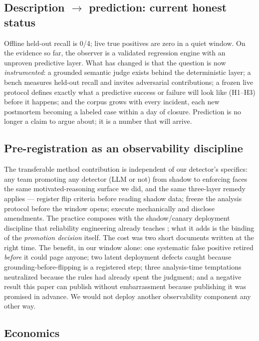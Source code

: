 \documentclass[11pt]{article}
\begin{document}
\subsection{Description $\rightarrow$ prediction: current honest status}

Offline held-out recall is 0/4; live true positives are zero in a quiet
window. On the evidence so far, the observer is a validated regression
engine with an unproven predictive layer. What has changed is that the
question is now \emph{instrumented}: a grounded semantic judge exists
behind the deterministic layer; a bench measures held-out recall and
invites adversarial contributions; a frozen live protocol defines
exactly what a predictive success or failure will look like (H1--H3)
before it happens; and the corpus grows with every incident, each new
postmortem becoming a labeled case within a day of closure. Prediction
is no longer a claim to argue about; it is a number that will arrive.

\subsection{Pre-registration as an observability discipline}
\label{sec:transfer}

The transferable method contribution is independent of our detector's
specifics: any team promoting any detector (LLM or not) from shadow to
enforcing faces the same motivated-reasoning surface we did, and the
same three-layer remedy applies --- register flip criteria before
reading shadow data; freeze the analysis protocol before the window
opens; execute mechanically and disclose amendments. The practice
composes with the shadow/canary deployment discipline that reliability
engineering already teaches \cite{beyer2016sre}; what it adds is the
binding of the \emph{promotion decision} itself. The cost was two short
documents written at the right time. The benefit, in our window alone:
one systematic false positive retired \emph{before} it could page
anyone; two latent deployment defects caught because
grounding-before-flipping is a registered step; three analysis-time
temptations neutralized because the rules had already spent the
judgment; and a negative result this paper can publish without
embarrassment because publishing it was promised in advance. We would
not deploy another observability component any other way.

\subsection{Economics}
\end{document}
